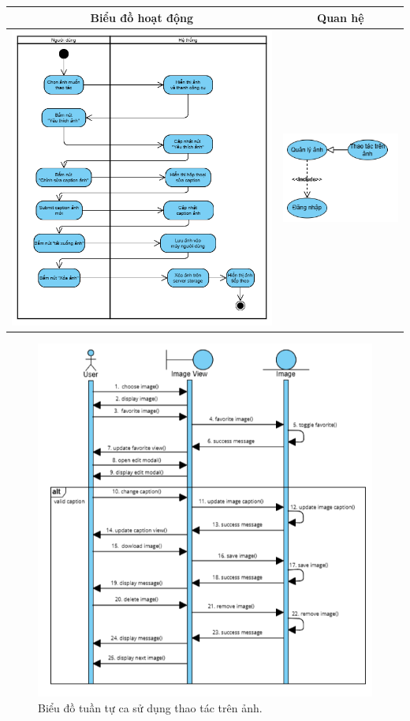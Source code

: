 \vspace{0.8cm}

\noindent 
\begin{tabular}{| c | c |}
    \hline
    \textbf{Biểu đồ hoạt động} & \textbf{Quan hệ} \\ 
    \hline
    \includegraphics[width=0.6\linewidth]{figures/c3/3-3-6-activity-diagram.png} 
    &  
    \includegraphics[width=0.35\linewidth]{figures/c3/3-3-6-relationship.png} \\ 
    \hline
\end{tabular}

\begin{figure}[H]
    \centering  
    \includegraphics[width=1\textwidth]{figures/c3/3-3-6-sequence-diagram.png}
    \caption{Biểu đồ tuần tự ca sử dụng thao tác trên ảnh.}
    \label{fig:3-3-6-sequence-diagram}
\end{figure}
